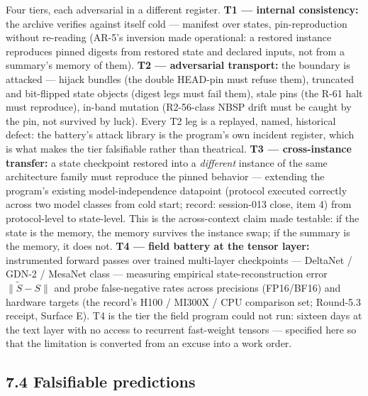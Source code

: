 \documentclass[11pt]{article}
\begin{document}
Four tiers, each adversarial in a different register. \textbf{T1 --- internal consistency:} the archive verifies against itself cold --- manifest over states, pin-reproduction without re-reading (AR-5's inversion made operational: a restored instance reproduces pinned digests from restored state and declared inputs, not from a summary's memory of them). \textbf{T2 --- adversarial transport:} the boundary is attacked --- hijack bundles (the double HEAD-pin must refuse them), truncated and bit-flipped state objects (digest legs must fail them), stale pins (the R-61 halt must reproduce), in-band mutation (R2-56-class NBSP drift must be caught by the pin, not survived by luck). Every T2 leg is a replayed, named, historical defect: the battery's attack library is the program's own incident register, which is what makes the tier falsifiable rather than theatrical. \textbf{T3 --- cross-instance transfer:} a state checkpoint restored into a \emph{different} instance of the same architecture family must reproduce the pinned behavior --- extending the program's existing model-independence datapoint (protocol executed correctly across two model classes from cold start; record: session-013 close, item 4) from protocol-level to state-level. This is the across-context claim made testable: if the state is the memory, the memory survives the instance swap; if the summary is the memory, it does not. \textbf{T4 --- field battery at the tensor layer:} instrumented forward passes over trained multi-layer checkpoints --- DeltaNet / GDN-2 / MesaNet class --- measuring empirical state-reconstruction error \(\lVert\tilde{S} - S\rVert\) and probe false-negative rates across precisions (FP16/BF16) and hardware targets (the record's H100 / MI300X / CPU comparison set; Round-5.3 receipt, Surface E). T4 is the tier the field program could not run: sixteen days at the text layer with no access to recurrent fast-weight tensors --- specified here so that the limitation is converted from an excuse into a work order.

\subsection{7.4 Falsifiable predictions}\label{falsifiable-predictions}
\end{document}
